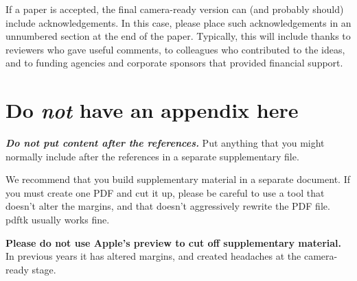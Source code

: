 \documentclass{article}
\begin{document}
If a paper is accepted, the final camera-ready version can (and
probably should) include acknowledgements. In this case, please
place such acknowledgements in an unnumbered section at the
end of the paper. Typically, this will include thanks to reviewers
who gave useful comments, to colleagues who contributed to the ideas,
and to funding agencies and corporate sponsors that provided financial
support.


\nocite{langley00}





\appendix
\section{Do \emph{not} have an appendix here}

\textbf{\emph{Do not put content after the references.}}
%
Put anything that you might normally include after the references in a separate
supplementary file.

We recommend that you build supplementary material in a separate document.
If you must create one PDF and cut it up, please be careful to use a tool that
doesn't alter the margins, and that doesn't aggressively rewrite the PDF file.
pdftk usually works fine. 

\textbf{Please do not use Apple's preview to cut off supplementary material.} In
previous years it has altered margins, and created headaches at the camera-ready
stage. 

\end{document}

